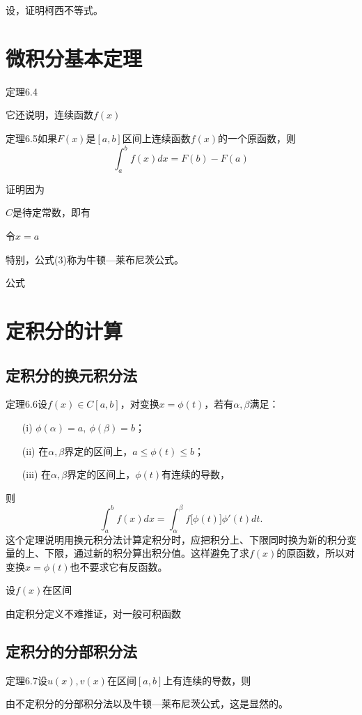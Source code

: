 \noindent 设，证明柯西不等式。

\section{微积分基本定理}

定理6.4

它还说明，连续函数$f(x)$

定理6.5\quad 如果$F(x)$是$[a,b]$区间上连续函数$f(x)$的一个原函数，则
\[
\int_a^bf(x)dx=F(b)-F(a) \tag{3}
\]

证明\quad 因为

$C$是待定常数，即有

令$x=a$

\noindent 特别，公式(3)称为牛顿—莱布尼茨公式。

\noindent 公式

\section{定积分的计算}
\subsection{定积分的换元积分法}

定理6.6\quad 设$f(x)\in C[a,b]$，对变换$x=\phi(t)$，若有$\alpha,\beta$满足：
\begin{enumerate}
    \item[(i)] $\phi(\alpha)=a,\ \phi(\beta)=b$；
    \item[(ii)] 在$\alpha,\beta$界定的区间上，$a\le \phi(t)\le b$；
    \item[(iii)] 在$\alpha,\beta$界定的区间上，$\phi(t)$有连续的导数，
\end{enumerate}
则
\[
\int_a^bf(x)dx=\int_{\alpha}^{\beta}f\bigl[\phi(t)\bigr]\phi'(t)dt.
\]
这个定理说明用换元积分法计算定积分时，应把积分上、下限同时换为新的积分变量的上、下限，通过新的积分算出积分值。这样避免了求$f(x)$的原函数，所以对变换$x=\phi(t)$也不要求它有反函数。

设$f(x)$在区间

由定积分定义不难推证，对一般可积函数

\subsection{定积分的分部积分法}

定理6.7\quad 设$u(x),v(x)$在区间$[a,b]$上有连续的导数，则

由不定积分的分部积分法以及牛顿—莱布尼茨公式，这是显然的。

